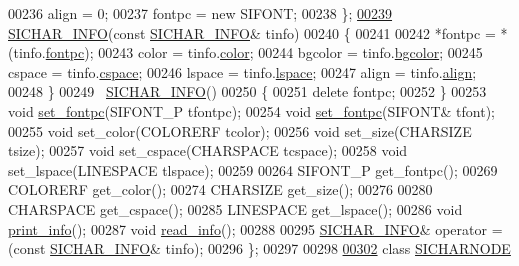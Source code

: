 \begin{DoxyCode}
00236         align = 0;
00237         fontpc = \textcolor{keyword}{new} SIFONT;
00238     \};
\hyperlink{class_s_i_c_h_a_r___i_n_f_o_a21b428740b8332500ae61f43b700d6b2}{00239}     \hyperlink{class_s_i_c_h_a_r___i_n_f_o_a21b428740b8332500ae61f43b700d6b2}{SICHAR\_INFO}(\textcolor{keyword}{const} \hyperlink{class_s_i_c_h_a_r___i_n_f_o}{SICHAR\_INFO}& tinfo) 
00240     \{
00241 
00242         *fontpc = *(tinfo.\hyperlink{class_s_i_c_h_a_r___i_n_f_o_a8d998c494943882d98981f79f620460d}{fontpc});
00243         color = tinfo.\hyperlink{class_s_i_c_h_a_r___i_n_f_o_ab9605aad10f9e033ed8e004468beeab9}{color};
00244         bgcolor = tinfo.\hyperlink{class_s_i_c_h_a_r___i_n_f_o_a838a052749c0c04c6f20c633b1cc4432}{bgcolor};
00245         cspace = tinfo.\hyperlink{class_s_i_c_h_a_r___i_n_f_o_a575d876eda778563dec0f72bd4bc06ea}{cspace};
00246         lspace = tinfo.\hyperlink{class_s_i_c_h_a_r___i_n_f_o_ace4bad34a55f914a2fbbdeb8f9a22bae}{lspace};
00247         align = tinfo.\hyperlink{class_s_i_c_h_a_r___i_n_f_o_a698a16c3b045894991c8aa2982190c7e}{align};
00248     \}
00249     ~\hyperlink{class_s_i_c_h_a_r___i_n_f_o}{SICHAR\_INFO}()   
00250     \{
00251         \textcolor{keyword}{delete} fontpc;
00252     \}
00253     \textcolor{keywordtype}{void} \hyperlink{class_s_i_c_h_a_r_n_o_d_e_aad179bc8f8fc9a4789e0b9ba06ecef9a}{set\_fontpc}(SIFONT\_P tfontpc);    
00254     \textcolor{keywordtype}{void} \hyperlink{class_s_i_c_h_a_r_n_o_d_e_aad179bc8f8fc9a4789e0b9ba06ecef9a}{set\_fontpc}(SIFONT& tfont);   
00255     \textcolor{keywordtype}{void} set\_color(COLORERF tcolor);    
00256     \textcolor{keywordtype}{void} set\_size(CHARSIZE tsize);  
00257     \textcolor{keywordtype}{void} set\_cspace(CHARSPACE tcspace); 
00258     \textcolor{keywordtype}{void} set\_lspace(LINESPACE tlspace); 
00259 
00264     SIFONT\_P get\_fontpc();  
00269     COLORERF get\_color();   
00274     CHARSIZE get\_size();
00276 
00280     CHARSPACE get\_cspace();
00285     LINESPACE get\_lspace();
00286     \textcolor{keywordtype}{void} \hyperlink{class_s_i_c_h_a_r_n_o_d_e_a4b4d71bb1d49d56399586b214897bec4}{print\_info}();    
00287     \textcolor{keywordtype}{void} \hyperlink{class_s_i_c_h_a_r_n_o_d_e_ae51d8c92371116aedf5510bb3096104c}{read\_info}();  
00288 
00295     \hyperlink{class_s_i_c_h_a_r___i_n_f_o}{SICHAR\_INFO}& operator = (\textcolor{keyword}{const} \hyperlink{class_s_i_c_h_a_r___i_n_f_o}{SICHAR\_INFO}& tinfo);   
00296 \};
00297 
00298 
\hyperlink{class_s_i_c_h_a_r_n_o_d_e}{00302} \textcolor{keyword}{class }\hyperlink{class_s_i_c_h_a_r_n_o_d_e}{SICHARNODE}

\end{DoxyCode}
